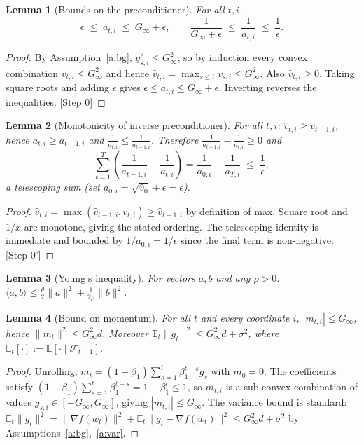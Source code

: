 \documentclass[11pt]{article}
\newtheorem{lemma}{Lemma}
\begin{document}
\begin{lemma}[Bounds on the preconditioner]\label{lem:precond}
For all $t,i$,
\[
\epsilon \;\le\; a_{t,i} \;\le\; G_\infty + \epsilon,
\qquad
\frac{1}{G_\infty+\epsilon}\;\le\;\frac{1}{a_{t,i}}\;\le\;\frac{1}{\epsilon}.
\]
\end{lemma}
\begin{proof}
By Assumption~\ref{a:bg}, $g_{s,i}^2\le G_\infty^2$, so by induction every
convex combination $v_{t,i}\le G_\infty^2$ and hence
$\hat v_{t,i}=\max_{s\le t}v_{s,i}\le G_\infty^2$. Also $\hat v_{t,i}\ge 0$.
Taking square roots and adding $\epsilon$ gives
$\epsilon\le a_{t,i}\le G_\infty+\epsilon$. Inverting reverses the
inequalities. \hfill[Step 0]
\end{proof}

\begin{lemma}[Monotonicity of inverse preconditioner]\label{lem:mono}
For all $t,i$: $\hat v_{t,i}\ge \hat v_{t-1,i}$, hence $a_{t,i}\ge a_{t-1,i}$
and $\frac{1}{a_{t,i}}\le \frac{1}{a_{t-1,i}}$. Therefore
$\frac{1}{a_{t-1,i}}-\frac{1}{a_{t,i}}\ge 0$ and
\[
\sum_{t=1}^{T}\left(\frac{1}{a_{t-1,i}}-\frac{1}{a_{t,i}}\right)
=\frac{1}{a_{0,i}}-\frac{1}{a_{T,i}}\;\le\;\frac{1}{\epsilon},
\]
a telescoping sum (set $a_{0,i}=\sqrt{\hat v_0}+\epsilon=\epsilon$).
\end{lemma}
\begin{proof}
$\hat v_{t,i}=\max(\hat v_{t-1,i},v_{t,i})\ge \hat v_{t-1,i}$ by definition of
max. Square root and $1/x$ are monotone, giving the stated ordering. The
telescoping identity is immediate and bounded by $1/a_{0,i}=1/\epsilon$ since
the final term is non-negative. \hfill[Step 0']
\end{proof}

\begin{lemma}[Young's inequality]\label{lem:young}
For vectors $a,b$ and any $\rho>0$:
$\langle a,b\rangle \le \tfrac{\rho}{2}\|a\|^2 + \tfrac{1}{2\rho}\|b\|^2.$
\end{lemma}

\begin{lemma}[Bound on momentum]\label{lem:mombound}
For all $t$ and every coordinate $i$, $|m_{t,i}|\le G_\infty$, hence
$\|m_t\|^2\le G_\infty^2 d$. Moreover
$\mathbb{E}_t\|g_t\|^2\le G_\infty^2 d+\sigma^2$, where
$\mathbb{E}_t[\cdot]:=\mathbb{E}[\cdot\mid\mathcal{F}_{t-1}]$.
\end{lemma}
\begin{proof}
Unrolling, $m_t=(1-\beta_1)\sum_{s=1}^t \beta_1^{t-s}g_s$ with $m_0=0$.
The coefficients satisfy
$(1-\beta_1)\sum_{s=1}^t\beta_1^{t-s}=1-\beta_1^{t}\le 1$, so $m_{t,i}$ is a
sub-convex combination of values $g_{s,i}\in[-G_\infty,G_\infty]$, giving
$|m_{t,i}|\le G_\infty$. The variance bound is standard:
$\mathbb{E}_t\|g_t\|^2=\|\nabla f(w_t)\|^2+\mathbb{E}_t\|g_t-\nabla f(w_t)\|^2
\le G_\infty^2 d+\sigma^2$ by Assumptions~\ref{a:bg},~\ref{a:var}.
\end{proof}
\end{document}
